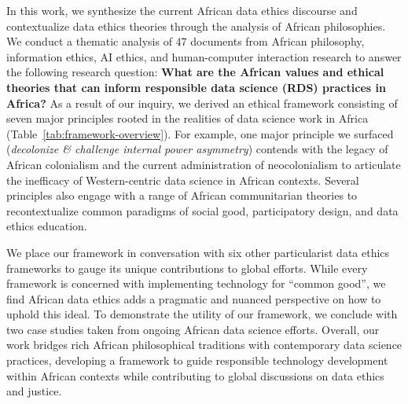 In this work, we synthesize the current African data ethics discourse and contextualize data ethics theories through 
the analysis of African philosophies. 
We conduct a thematic analysis of 47 documents from African philosophy, information ethics, AI ethics, and human-computer interaction research to answer the following research question: \textbf{What are the African values and ethical theories that can inform responsible data science (RDS) practices in Africa?} 
As a result of our inquiry, we derived an ethical framework consisting of seven major principles rooted in the realities of data science work in Africa (Table~\ref{tab:framework-overview}). 
For example, one major principle we surfaced (\textit{decolonize \& challenge internal power asymmetry}) contends with the legacy of African colonialism and the current administration of neocolonialism to articulate the inefficacy of Western-centric data science in African contexts. 
Several principles also engage with a range of African communitarian theories to recontextualize common paradigms of social good, participatory design, and data ethics education. 


We place our framework in conversation with six other particularist data ethics frameworks to gauge its unique contributions to global efforts. While every framework is concerned with implementing technology for ``common good'',  we find African data ethics adds a pragmatic and nuanced perspective on how to uphold this ideal.
To demonstrate the utility of our framework, we conclude with two case studies taken from ongoing African data science efforts.
Overall, our work bridges rich African philosophical traditions with contemporary data science practices, developing a framework to guide responsible technology development within African contexts while contributing to global discussions on data ethics and justice.

